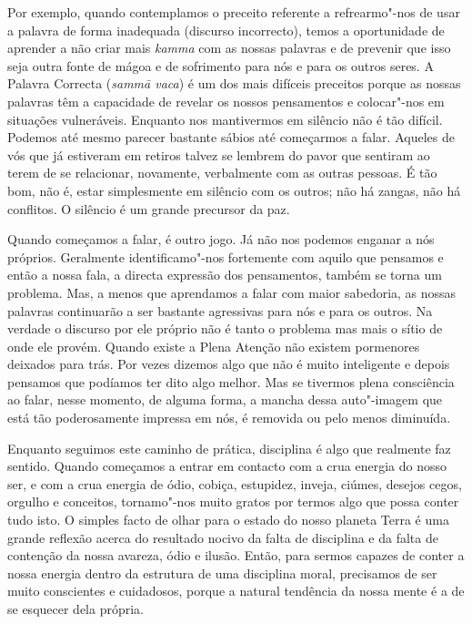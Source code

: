 Por exemplo, quando contemplamos o preceito referente a refrearmo"-nos de
usar a palavra de forma inadequada (discurso incorrecto), temos a
oportunidade de aprender a não criar mais \emph{kamma} com as nossas
palavras e de prevenir que isso seja outra fonte de mágoa e de
sofrimento para nós e para os outros seres. A Palavra Correcta
(\emph{sammā vaca}) é um dos mais difíceis preceitos porque as nossas
palavras têm a capacidade de revelar os nossos pensamentos e colocar"-nos
em situações vulneráveis. Enquanto nos mantivermos em silêncio não é tão
difícil. Podemos até mesmo parecer bastante sábios até começarmos a
falar. Aqueles de vós que já estiveram em retiros talvez se lembrem do
pavor que sentiram ao terem de se relacionar, novamente, verbalmente com
as outras pessoas. É tão bom, não é, estar simplesmente em silêncio com
os outros; não há zangas, não há conflitos. O silêncio é um grande
precursor da paz.

Quando começamos a falar, é outro jogo. Já não nos podemos enganar a nós
próprios. Geralmente identificamo"-nos fortemente com aquilo que pensamos
e então a nossa fala, a directa expressão dos pensamentos, também se
torna um problema. Mas, a menos que aprendamos a falar com maior
sabedoria, as nossas palavras continuarão a ser bastante agressivas para
nós e para os outros. Na verdade o discurso por ele próprio não é tanto
o problema mas mais o sítio de onde ele provém. Quando existe a Plena
Atenção não existem pormenores deixados para trás. Por vezes dizemos
algo que não é muito inteligente e depois pensamos que podíamos ter dito
algo melhor. Mas se tivermos plena consciência ao falar, nesse momento,
de alguma forma, a mancha dessa auto"-imagem que está tão poderosamente
impressa em nós, é removida ou pelo menos diminuída.

Enquanto seguimos este caminho de prática, disciplina é algo que
realmente faz sentido. Quando começamos a entrar em contacto com a crua
energia do nosso ser, e com a crua energia de ódio, cobiça, estupidez,
inveja, ciúmes, desejos cegos, orgulho e conceitos, tornamo"-nos muito
gratos por termos algo que possa conter tudo isto. O simples facto de
olhar para o estado do nosso planeta Terra é uma grande reflexão acerca
do resultado nocivo da falta de disciplina e da falta de contenção da
nossa avareza, ódio e ilusão. Então, para sermos capazes de conter a
nossa energia dentro da estrutura de uma disciplina moral, precisamos de
ser muito conscientes e cuidadosos, porque a natural tendência da nossa
mente é a de se esquecer dela própria.

